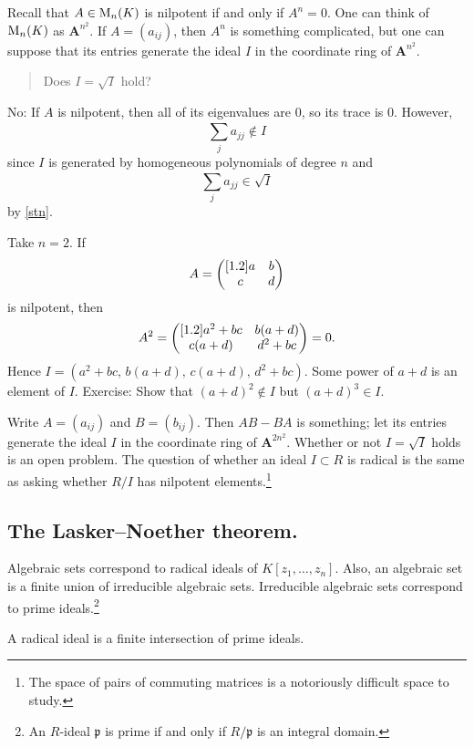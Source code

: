 \documentclass [11 pt, oneside] {article}
\begin{document}
\begin{example}\label{}
Recall that $A\in \operatorname{M}_n(K)$ is nilpotent if and only if $A^n = 0$. One can think of $\operatorname{M}_n(K)$ as $\mathbf{A}^{n^2}$. If $A = (a_{ij})$, then $A^n$ is something complicated, but one can suppose that its entries generate the ideal $I$ in the coordinate ring of $\mathbf{A}^{n^2}$. 
\begin{quote}
	\small Does $I=\sqrt{I}$ hold?
\end{quote} 
No: If $A$ is nilpotent, then all of its eigenvalues are $0$, so its trace is $0$. However, 
\[
	\sum_{j}^{} a_{jj}\notin I
\] 
since $I$ is generated by homogeneous polynomials of degree $n$ and 
\[
	\sum_{j}^{} a_{jj} \in \sqrt{I}
\] 
by \cref{stn}.

Take $n=2$. If 
\begin{align*}
	A = \begin{pmatrix} [1.2] a&b\\c&d\end{pmatrix}
\end{align*}
is nilpotent, then
\begin{align*}
	A^2 = \begin{pmatrix} [1.2] a^2 + bc&b(a+d)\\c (a+d) &d^2 + bc\end{pmatrix} = 0.
\end{align*}
Hence $I=   (a^2+bc,\, b(a+d), \,c (a+d),\,d^2 + bc)$. Some power of $a+d$ is an element of $I$. Exercise: Show that $(a+d)^2\notin I$ but $(a+d)^3\in I$.
\end{example}

\begin{example}\label{}
Write $A=(a_{ij})$ and $B=(b_{ij})$. Then $AB-BA$ is something; let its entries generate the ideal $I$ in the coordinate ring of $\mathbf{A}^{2n^2}$. Whether or not $I=\sqrt{I}$ holds is an open problem. The question of whether an ideal $I\subset R$ is radical is the same as asking whether $R/I$ has nilpotent elements.\footnote{The space of pairs of commuting matrices is a notoriously difficult space to study.}
\end{example}

\subsection{The Lasker--Noether theorem.}
Algebraic sets correspond to radical ideals of $K[z_1,\hdots, z_n]$. Also, an algebraic set is a finite union of irreducible algebraic sets. Irreducible algebraic sets correspond to prime ideals.\footnote{An $R$-ideal $\mathfrak{p}$ is prime if and only if $R/\mathfrak{p}$ is an integral domain.}

\begin{theorem}[ ]\label{}\index{}
A radical ideal is a finite intersection of prime ideals.
\end{theorem}
\end{document}

